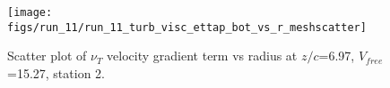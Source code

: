 \begin{figure}[H]
\centering
\texttt{[image: figs/run\_11/run\_11\_turb\_visc\_ettap\_bot\_vs\_r\_meshscatter]}
\caption{Scatter plot of $\nu_T$ velocity gradient term vs radius at $z/c$=6.97, $V_{free}$=15.27, station 2.}
\label{fig:run_11_turb_visc_ettap_bot_vs_r_meshscatter}
\end{figure}


